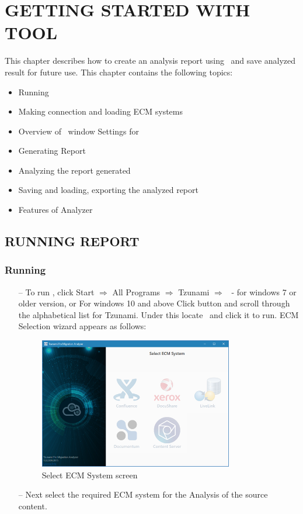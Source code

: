 \chapter{GETTING STARTED WITH \MakeUppercase{\appName} TOOL}
This chapter describes how to create an analysis report using \appName\ and save analyzed result for future use. This chapter contains the following topics:
\begin{itemize}
  \item Running \appName
  \item Making connection and loading ECM systems
  \item Overview of \appName\ window Settings for \appName
  \item Generating Report
  \item Analyzing the report generated
  \item Saving and loading, exporting the analyzed report
  \item Features of Analyzer
\end{itemize}
 \section{RUNNING \MakeUppercase{\appName} REPORT}

\subsection{Running \appName}
\begin{itemize}
\item[--] To run \appName, click Start $\Rightarrow$ All Programs $\Rightarrow$ Tzunami $\Rightarrow$ \appName\ - for windows 7 or older version, or
For windows 10 and above
Click    button and scroll through the alphabetical list for Tzunami. Under this locate \appName\ and click it to run. ECM Selection wizard appears as follows:
\begin{figure} 
  \centering
	\includegraphics[width=0.8\textwidth]{Images/SelectEccmScreen.png}
 \caption{Select ECM System screen}
\end{figure}
\item[--] Next select the required ECM system for the Analysis of the source content.
\end{itemize}

